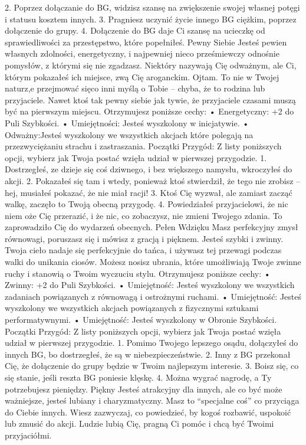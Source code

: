 2. Poprzez dołączanie do BG, widzisz szansę na zwiększenie swojej własnej potęgi i statusu kosztem innych.
3. Pragniesz uczynić życie innego BG ciężkim, poprzez dołączenie do grupy.
4. Dołączenie do BG daje Ci szansę na ucieczkę od sprawiedliwości za przestępstwo, które popełniłeś. 
Pewny Siebie
Jesteś pewien własnych zdolności, energetyczny, i najpewniej nieco prześmiewczy odnośnie pomysłów, z którymi się nie zgadzasz.  Niektóry nazywają Cię odważnym, ale Ci, którym pokazałeś ich miejsce, zwą Cię aroganckim. Ojtam. To nie w Twojej naturz,e przejmować sięco inni myślą o Tobie – chyba, że to rodzina lub przyjaciele. Nawet ktoś tak pewny siebie jak tywie, że przyjaciele czasami muszą być na pierwszym miejscu.
Otrzymujesz poniższe cechy:
    • Energetyczny: +2 do Puli Szybkości.
    • Umiejętności: Jesteś wyszkolony w inicjatywie. 
    • Odważny:Jesteś wyszkolony we wszystkich akcjach które polegają na przezwyciężaniu strachu i zastraszania. 
Początki Przygód: Z listy poniższych opcji, wybierz jak Twoja postać wzięła udział w pierwszej przygodzie.
1. Dostrzegłeś, ze dzieje się coś dziwnego, i bez większego namysłu, wkroczyłeś do akcji.
2. Pokazałeś się tam i wtedy, ponieważ ktoś stwierdził, że tego nie zrobisz – hej, musiałeś pokazać, że nie miał racji!
3. Ktoś Cię wyzwał, ale zamiast zacząć walkę, zaczęło to Twoją obecną przygodę.
4. Powiedziałeś przyjacielowi, że nic niem oże Cię przerazić, i że nic, co zobaczysz, nie zmieni Twojego zdania. To zaprowadziło Cię do wydarzeń obecnych. 
Pełen Wdzięku
Masz perfekcyjny zmysł równowagi, poruszasz się i mówisz z gracją i pięknem. Jesteś szybki i zwinny. Twoja cieło nadaje się perfekcyjnie do tańca, i używasz tej przewagi podczas walki do unikania ciosów. Możesz nosisz ubrania, które umożliwiają Twoje zwinne ruchy i stanowią o Twoim wyczuciu stylu.
Otrzymujesz poniższe cechy:
    • Zwinny: +2 do Puli Szybkości.
    • Umiejętność: Jesteś wyszkolony we wszystkich zadaniach powiązanych z równowagą i ostrożnymi ruchami.
    • Umiejętność: Jesteś wyszkolony we wszystkich akcjach powiązanych z fizycznymi sztukami performatywnymi.
    • Umiejętność: Jesteś wyszkolony w Obronie Szybkości.
Początki Przygód: Z listy poniższych opcji, wybierz jak Twoja postać wzięła udział w pierwszej przygodzie.
1. Pomimo Twojego lepszego osądu, dołączyłeś do innych BG, bo dostrzegłeś, że są w niebezpieczeństwie.  
2. Inny z BG przekonał Cię, że dołączenie do grupy będzie w Twoim najlepszym interesie.
3. Boisz się, co się stanie, jeśli reszta BG poniesie klęskę.
4. Można wygrać nagrodę, a Ty potrzebujesz pieniędzy.
Piękny
Jesteś atrakcyjny dla innych, ale co być może ważniejsze, jesteś lubiany i charyzmatyczny. Masz to “specjalne coś” co przyciąga do Ciebie innych. Wiesz zazwyczaj, co powiedzieć, by kogoś rozbawić, uspokoić lub zmusić do akcji. Ludzie lubią Cię, pragną Ci pomóc i chcą być Twoimi przyjaciółmi. 
